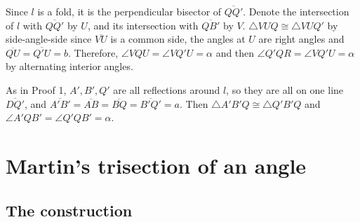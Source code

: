 Since $l$ is a fold, it is the perpendicular bisector of $\overline{QQ'}$. Denote the intersection of $l$ with $\overline{QQ'}$ by $U$, and its intersection with $\overline{QB'}$ by $V$. $\triangle VUQ\cong \triangle VUQ'$ by side-angle-side since $\overline{VU}$ is a common side,  the angles at $U$ are right angles and $\overline{QU}=\overline{Q'U}=b$. Therefore, $\angle VQU=\angle VQ'U=\alpha$ and then $\angle Q'QR=\angle VQ'U=\alpha$ by alternating interior angles.

As in Proof 1, $A', B', Q'$ are all reflections around $l$, so they are all on one line $\overline{DQ'}$, and $\overline{A'B'}=\overline{AB}=\overline{BQ}=\overline{B'Q'}=a$. Then $\triangle A'B'Q\cong\triangle Q'B'Q$ and $\angle A'QB'=\angle Q'QB'=\alpha$.


\newpage

\section{Martin's trisection of an angle}\label{s.tri2}

\subsection{The construction}

